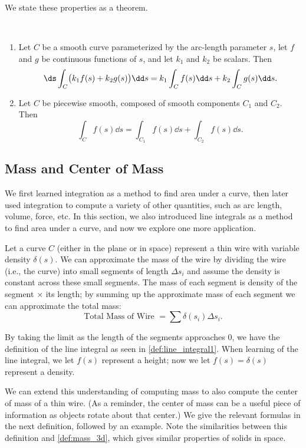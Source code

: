 We state these properties as a theorem.

\begin{theorem}\label{thm:line_int_properties_scalar}%
%
\mbox{}\\[-2\baselineskip]\parbox[t]{\linewidth}{\begin{enumerate}
	\item	Let $C$ be a smooth curve parameterized by the arc-length parameter $s$, let $f$ and $g$ be continuous functions of $s$, and let $k_1$ and $k_2$ be scalars. Then
\[\ds \int_C\bigl(k_1f(s)+k_2g(s)\bigr)\dd s = k_1\int_Cf(s)\dd s +k_2\int_Cg(s)\dd s.\]
	\item Let $C$ be piecewise smooth, composed of smooth components $C_1$ and $C_2$. Then
\[\int_Cf(s)\dd s = \int_{C_1}f(s)\dd s + \int_{C_2}f(s)\dd s.\]
\end{enumerate}}
\end{theorem}

\subsection{Mass and Center of Mass}

We first learned integration as a method to find area under a curve, then later used integration to compute a variety of other quantities, such as arc length, volume, force, etc. In this section, we also introduced line integrals as a method to find area under a curve, and now we explore one more application.

Let a curve $C$ (either in the plane or in space) represent a thin wire with variable density $\delta(s)$. We can approximate the mass of the wire by dividing the wire (i.e., the curve) into small segments of length $\Delta s_i$ and assume the density is constant across these small segments. The mass of each segment is density of the segment $\times$ its length; by summing up the approximate mass of each segment we can approximate the total mass:
\[\text{Total Mass of Wire } = \sum \delta(s_i)\Delta s_i.\]

By taking the limit as the length of the segments approaches 0, we have the definition of the line integral as seen in \autoref{def:line_integral1}. When learning of the line integral, we let $f(s)$ represent a height; now we let $f(s) = \delta(s)$ represent a density.

We can extend this understanding of computing mass to also compute the center of mass of a thin wire. (As a reminder, the center of mass can be a useful piece of information as objects rotate about that center.) We give the relevant formulas in the next definition, followed by an example. Note the similarities between this definition and \autoref{def:mass_3d}, which gives similar properties of solids in space.

